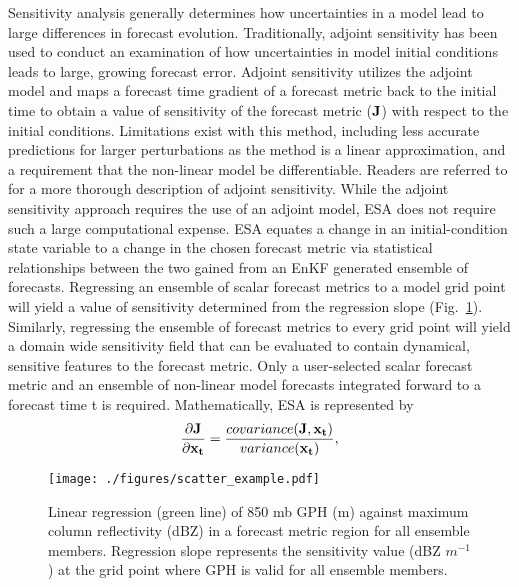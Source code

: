 \documentclass{ttuthes2007}
\newcommand{\tab}{\hspace*{2em}}  %
\begin{document}
\tab Sensitivity analysis generally determines how uncertainties in a model lead to large differences in forecast evolution. Traditionally, adjoint sensitivity has been used to conduct an examination of how uncertainties in model initial conditions leads to large, growing forecast error. Adjoint sensitivity utilizes the adjoint model and maps a forecast time gradient of a forecast metric back to the initial time to obtain a value of sensitivity of the forecast metric ($\bf{J}$) with respect to the initial conditions. Limitations exist with this method, including less accurate predictions for larger perturbations as the method is a linear approximation, and a requirement that the non-linear model be differentiable. Readers are referred to \cite{LeDimetandTalagrand1986} for a more thorough description of adjoint sensitivity. While the adjoint sensitivity approach requires the use of an adjoint model, ESA does not require such a large computational expense. ESA equates a change in an initial-condition state variable to a change in the chosen forecast metric via statistical relationships between the two gained from an EnKF generated ensemble of forecasts. Regressing an ensemble of scalar forecast metrics to a model grid point will yield a value of sensitivity determined from the regression slope (Fig.~\ref{scatter}). Similarly, regressing the ensemble of forecast metrics to every grid point will yield a domain wide sensitivity field that can be evaluated to contain dynamical, sensitive features to the forecast metric. Only a user-selected scalar forecast metric and an ensemble of non-linear model forecasts integrated forward to a forecast time t is required. Mathematically, ESA is represented by
\begin{align}\label{ens_sens}
	\frac{\partial \bf{J}}{\partial \bf{x_t}} = \frac{covariance(\bf{J},\bf{x_t})}{variance(\bf{x_t})},
\end{align}

\begin{figure}[t]
  \centering
  \noindent\texttt{[image: ./figures/scatter\_example.pdf]}\\
  \caption{Linear regression (green line) of 850 mb GPH (m) against maximum column reflectivity (dBZ) in a forecast metric region for all ensemble members. Regression slope represents the sensitivity value (dBZ $m^{-1}$) at the grid point where GPH is valid for all ensemble members.}
\label{scatter}
\end{figure}
\end{document}
